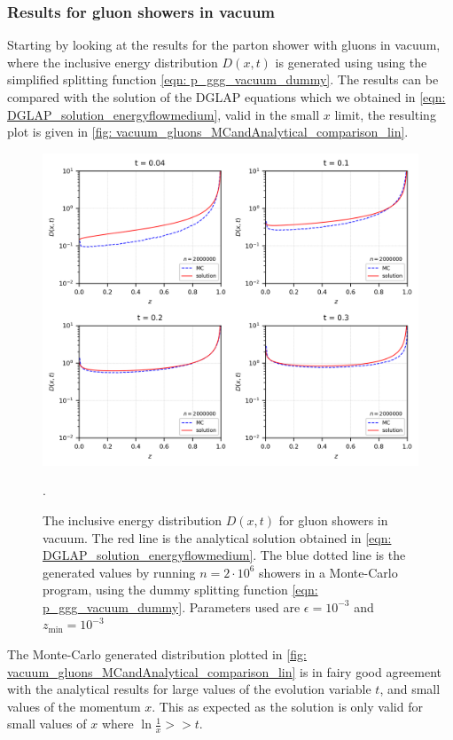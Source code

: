\documentclass[main.tex]{subfiles}
\begin{document}
\subsubsection*{Results for gluon showers in vacuum}
Starting by looking at the results for the parton shower with gluons in vacuum, where the inclusive energy distribution \(D(x,t)\) is generated using using the simplified splitting function \autoref{eqn: p_ggg_vacuum_dummy}. The results can be compared with the solution of the DGLAP equations which we obtained in \autoref{eqn: DGLAP_solution_energyflowmedium}, valid in the small \(x\) limit, the resulting plot is given in \autoref{fig: vacuum_gluons_MCandAnalytical_comparison_lin}.
\begin{figure}[htb]
    \centering
    \includegraphics[width=13cm]{pictures/plots/distributions/vacuum/vacuum_shower_analytical_2m_lin.png}
    \caption{The inclusive energy distribution \(D(x,t)\) for gluon showers in vacuum. The red line is the analytical solution obtained in \autoref{eqn: DGLAP_solution_energyflowmedium}. The blue dotted line is the generated values by running \(n=2\cdot10^6\) showers in a Monte-Carlo program, using the dummy splitting function \autoref{eqn: p_ggg_vacuum_dummy}. Parameters used are \(\epsilon=10^{-3}\) and \(z_{\text{min}}=10^{-3}\)}.
    \label{fig: vacuum_gluons_MCandAnalytical_comparison_lin}
\end{figure}

The Monte-Carlo generated distribution plotted in \autoref{fig: vacuum_gluons_MCandAnalytical_comparison_lin} is in fairy good agreement with the analytical results for large values of the evolution variable \(t\), and small values of the momentum \(x\). This as expected as the solution is only valid for small values of \(x\) where \(\ln \frac{1}{x} >>t\).
\end{document}
